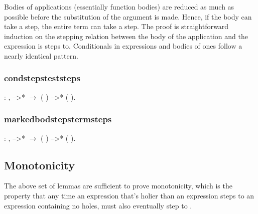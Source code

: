 \documentclass[12pt]{report}
\begin{document}
 Bodies of applications (essentially function bodies) are reduced
as much as possible before the substitution of the argument is
made. Hence, if the body can take a step, the entire term can take
a step. The proof is straightforward induction on the stepping
relation between the body of the application and the expression is
steps to. Conditionals in  expressions and bodies of  ones follow a nearly identical pattern. 

\subsubsection{condstepsteststeps}

\begin{coqdoccode}
\coqdocemptyline
\coqdocindent{1.00em}
  : \coqdockw{\ensuremath{\forall}}    ,\coqdoceol
\coqdocindent{2.00em}
 -->*  \ensuremath{\rightarrow}\coqdoceol
\coqdocindent{2.00em}
(   ) -->* (   ).\coqdoceol
\coqdocemptyline
\end{coqdoccode}
\subsubsection{markedbodstepstermsteps}

\begin{coqdoccode}
\coqdocemptyline
\coqdocindent{1.00em}
  : \coqdockw{\ensuremath{\forall}}   ,\coqdoceol
\coqdocindent{2.00em}
 -->*  \ensuremath{\rightarrow}\coqdoceol
\coqdocindent{2.00em}
(  ) -->* (  ).\coqdoceol
\coqdocemptyline
\end{coqdoccode}
\subsection{Monotonicity}



 The above set of lemmas are sufficient to prove
monotonicity, which is the property that any time an expression 
that's holier than an expression  steps to an expression 
containing no holes,  must also eventually step to . 
\end{document}
